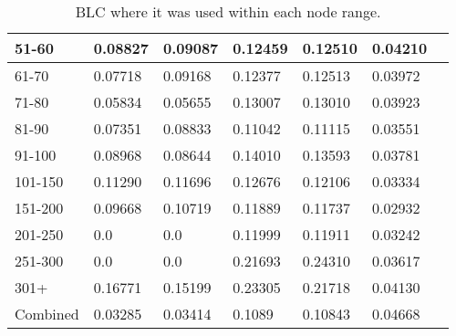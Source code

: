 \begin{table*}[h!]
\begin{tabular}{|l|l|l||l|l||l|l|}
        51-60    & 0.08827                                 & 0.09087                        & 0.12459                          & 0.12510        & 0.04210       &                \\ \hline
        61-70    & 0.07718                                 & 0.09168                        & 0.12377                          & 0.12513        & 0.03972       &                \\ \hline
        71-80    & 0.05834                                 & 0.05655                        & 0.13007                          & 0.13010        & 0.03923       &                \\ \hline
        81-90    & 0.07351                                 & 0.08833                        & 0.11042                          & 0.11115        & 0.03551       &                \\ \hline
        91-100   & 0.08968                                 & 0.08644                        & 0.14010                          & 0.13593        & 0.03781       &                \\ \hline
        101-150  & 0.11290                                 & 0.11696                        & 0.12676                          & 0.12106        & 0.03334       &                \\ \hline
        151-200  & 0.09668                                 & 0.10719                        & 0.11889                          & 0.11737        & 0.02932       &                \\ \hline
        201-250  & 0.0                                     & 0.0                            & 0.11999                          & 0.11911        & 0.03242       &                \\ \hline
        251-300  & 0.0                                     & 0.0                            & 0.21693                          & 0.24310        & 0.03617       &                \\ \hline
        301+     & 0.16771                                 & 0.15199                        & 0.23305                          & 0.21718        & 0.04130       &                \\ \hline
        Combined & 0.03285                                 & 0.03414                        & 0.1089                           & 0.10843        & 0.04668       &                \\ \hline
    \end{tabular}
    \caption{BLC where it was used within each node range.}
    \label{tab:BLC-degree-based-ndcg}
\end{table*}

